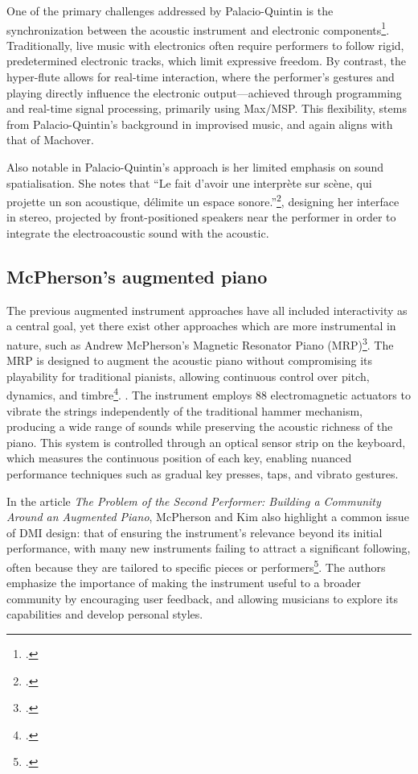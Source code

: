 \documentclass[12pt,twoside,maitrise]{dms_ks}
\theoremstyle{definition}
\begin{document}
{One of the primary challenges addressed by Palacio-Quintin is the synchronization between the acoustic instrument and electronic components\footcite[10--11]{palacio-quintin_composition_2012-1}. 
Traditionally, live music with electronics often require performers to follow rigid, predetermined electronic tracks, which limit expressive freedom. 
By contrast, the hyper-flute allows for real-time interaction, where the performer's gestures and playing directly influence the electronic output---achieved through programming and real-time signal processing, primarily using Max/MSP.
This flexibility, stems from Palacio-Quintin's background in improvised music, and again aligns with that of Machover.

Also notable in Palacio-Quintin's approach is her limited emphasis on sound spatialisation. 
She notes that “Le fait d’avoir une interprète sur scène, qui projette un son acoustique, délimite un espace sonore.”\footcite[50]{palacio-quintin_composition_2012-1}, designing her interface in stereo, projected by front-positioned speakers near the performer in order to integrate the electroacoustic sound with the acoustic. 

\subsection{McPherson's augmented piano}

The previous augmented instrument approaches have all included interactivity as a central goal, yet there exist other approaches which are more instrumental in nature, such as Andrew McPherson's Magnetic Resonator Piano (MRP)\footcite{andrew_mcpherson_magnetic_2010}.
The MRP is designed to augment the acoustic piano without compromising its playability for traditional pianists, allowing continuous control over pitch, dynamics, and timbre\footcite[10]{mcpherson_problem_2012}. 
.
The instrument employs 88 electromagnetic actuators to vibrate the strings independently of the traditional hammer mechanism, producing a wide range of sounds while preserving the acoustic richness of the piano. 
This system is controlled through an optical sensor strip on the keyboard, which measures the continuous position of each key, enabling nuanced performance techniques such as gradual key presses, taps, and vibrato gestures.

In the article \textit{The Problem of the Second Performer: Building a Community Around an Augmented Piano}, McPherson and Kim also highlight a common issue of DMI design: that of ensuring the instrument's relevance beyond its initial performance, with many new instruments failing to attract a significant following, often because they are tailored to specific pieces or performers\footcite[10--11]{mcpherson_problem_2012}. 
The authors emphasize the importance of making the instrument useful to a broader community by encouraging user feedback, and allowing musicians to explore its capabilities and develop personal styles.

}
\end{document}
